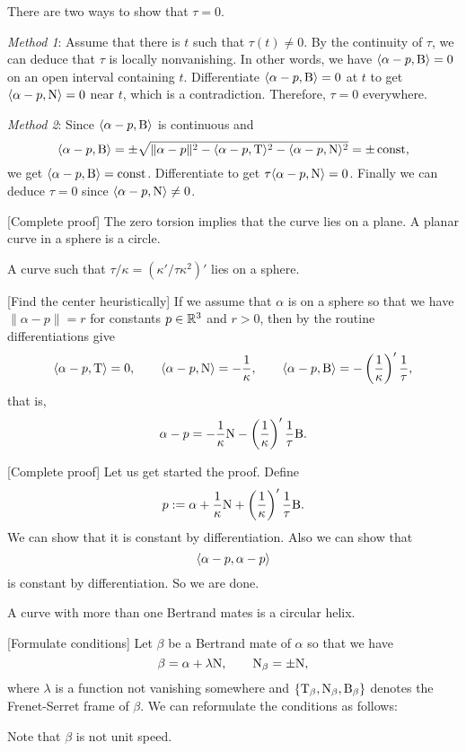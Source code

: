 \documentclass{../note}
\def\a{\alpha}
\begin{document}
\begin{prb}
\begin{sol}
There are two ways to show that $\tau=0$.

\emph{Method 1}:
Assume that there is $t$ such that $\tau(t)\ne0$.
By the continuity of $\tau$, we can deduce that $\tau$ is locally nonvanishing.
In other words, we have $\<\a-p,\rB\>=0$ on an open interval containing $t$.
Differentiate $\<\a-p,\rB\>=0$ at $t$ to get $\<\a-p,\rN\>=0$ near $t$, which is a contradiction.
Therefore, $\tau=0$ everywhere.

\emph{Method 2}:
Since $\<\a-p,\rB\>$ is continuous and
\[\<\a-p,\rB\>=\pm\sqrt{\|\a-p\|^2-\<\a-p,\rT\>^2-\<\a-p,\rN\>^2}=\pm\const,\]
we get $\<\a-p,\rB\>=\const$.
Differentiate to get $\tau\<\a-p,\rN\>=0$.
Finally we can deduce $\tau=0$ since $\<\a-p,\rN\>\ne0$.

[Complete proof]
The zero torsion implies that the curve lies on a plane.
A planar curve in a sphere is a circle.
\end{sol}

\begin{prb}
A curve such that $\tau/\kappa=(\kappa'/\tau\kappa^2)'$ lies on a sphere.
\end{prb}
\begin{sol}
[Find the center heuristically]
If we assume that $\a$ is on a sphere so that we have $\|\a-p\|=r$ for constants $p\in\mathbb{R}^3$ and $r>0$, then by the routine differentiations give
\[\<\a-p,\rT\>=0,\qquad\<\a-p,\rN\>=-\frac1\kappa,\qquad\<\a-p,\rB\>=-\left(\frac1\kappa\right)'\frac1\tau,\]
that is,
\[\a-p=-\frac1\kappa\rN-\left(\frac1\kappa\right)'\frac1\tau\rB.\]

[Complete proof]
Let us get started the proof.
Define
\[p:=\a+\frac1\kappa\rN+\left(\frac1\kappa\right)'\frac1\tau\rB.\]
We can show that it is constant by differentiation.
Also we can show that
\[\<\a-p,\a-p\>\]
is constant by differentiation.
So we are done.
\end{sol}

\begin{prb}
A curve with more than one Bertrand mates is a circular helix.
\end{prb}
\begin{sol}
[Formulate conditions]
Let $\beta$ be a Bertrand mate of $\a$ so that we have
\[\beta=\a+\lambda\rN,\qquad\rN_\beta=\pm\rN,\]
where $\lambda$ is a function not vanishing somewhere and $\{\mathrm{T}_\beta,\mathrm{N}_\beta,\mathrm{B}_\beta\}$ denotes the Frenet-Serret frame of $\beta$.
We can reformulate the conditions as follows:

Note that $\beta$ is not unit speed.


\end{sol}
\end{prb}
\end{document}
